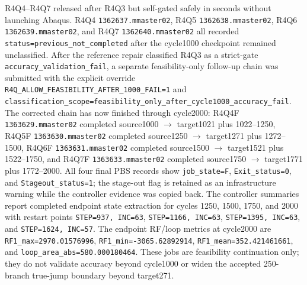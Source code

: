 \documentclass{article}
\begin{document}
R4Q4--R4Q7 released after R4Q3 but self-gated safely in seconds without launching Abaqus. R4Q4 \texttt{1362637.mmaster02}, R4Q5 \texttt{1362638.mmaster02}, R4Q6 \texttt{1362639.mmaster02}, and R4Q7 \texttt{1362640.mmaster02} all recorded \texttt{status=previous\_not\_completed} after the cycle1000 checkpoint remained unclassified. After the reference repair classified R4Q3 as a strict-gate \texttt{accuracy\_validation\_fail}, a separate feasibility-only follow-up chain was submitted with the explicit override \texttt{R4Q\_ALLOW\_FEASIBILITY\_AFTER\_1000\_FAIL=1} and \texttt{classification\_scope=feasibility\_only\_after\_cycle1000\_accuracy\_fail}. The corrected chain has now finished through cycle2000: R4Q4F \texttt{1363629.mmaster02} completed source1000 \(\rightarrow\) target1021 plus 1022--1250, R4Q5F \texttt{1363630.mmaster02} completed source1250 \(\rightarrow\) target1271 plus 1272--1500, R4Q6F \texttt{1363631.mmaster02} completed source1500 \(\rightarrow\) target1521 plus 1522--1750, and R4Q7F \texttt{1363633.mmaster02} completed source1750 \(\rightarrow\) target1771 plus 1772--2000. All four final PBS records show \texttt{job\_state=F}, \texttt{Exit\_status=0}, and \texttt{Stageout\_status=1}; the stage-out flag is retained as an infrastructure warning while the controller evidence was copied back. The controller summaries report completed endpoint state extraction for cycles 1250, 1500, 1750, and 2000 with restart points \texttt{STEP=937, INC=63}, \texttt{STEP=1166, INC=63}, \texttt{STEP=1395, INC=63}, and \texttt{STEP=1624, INC=57}. The endpoint RF/loop metrics at cycle2000 are \texttt{RF1\_max=2970.01576996}, \texttt{RF1\_min=-3065.62892914}, \texttt{RF1\_mean=352.421461661}, and \texttt{loop\_area\_abs=580.000180464}. These jobs are feasibility continuation only; they do not validate accuracy beyond cycle1000 or widen the accepted 250-branch true-jump boundary beyond target271.
\end{document}
